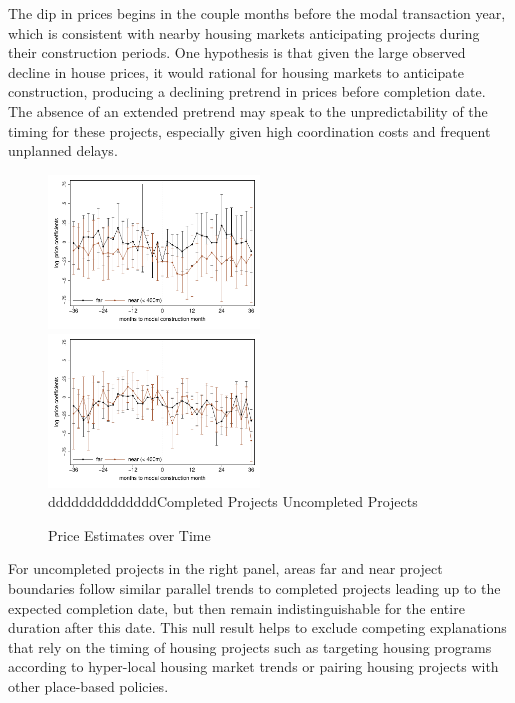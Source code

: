 \documentclass[12pt]{article}
\begin{document}
The dip in prices begins in the couple months before the modal transaction year, which is consistent with nearby housing markets anticipating projects during their construction periods.  One hypothesis is that given the large observed decline in house prices, it would rational for housing markets to anticipate construction, producing a declining pretrend in prices before completion date.  The absence of an extended pretrend may speak to the unpredictability of the timing for these projects, especially given high coordination costs and frequent unplanned delays.

\begin{figure}
\caption{Price Estimates over Time}\label{figure:timeplot}
\includegraphics[width=0.5\textwidth,trim={.77cm 0cm .21cm 0cm}]{figures/timeplot.pdf}
   \hfill
\includegraphics[width=0.5\textwidth,trim={.77cm 0cm .21cm 0cm},clip]{figures/timeplot_placebo.pdf}\\
{\color{white}dddddddddddddd}Completed Projects \hspace{4.2cm} Uncompleted Projects
\end{figure}

For uncompleted projects in the right panel, areas far and near project boundaries follow similar parallel trends to completed projects leading up to the expected completion date, but then remain indistinguishable for the entire duration after this date.  This null result helps to exclude competing explanations that rely on the timing of housing projects such as targeting housing programs according to hyper-local housing market trends or pairing housing projects with other place-based policies.  
\end{document}
